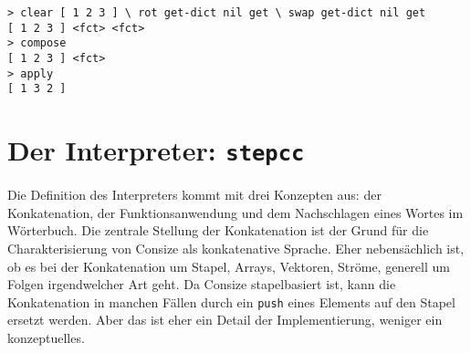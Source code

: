 \begin{verbatim}
> clear [ 1 2 3 ] \ rot get-dict nil get \ swap get-dict nil get
[ 1 2 3 ] <fct> <fct>
> compose
[ 1 2 3 ] <fct>
> apply
[ 1 3 2 ]
\end{verbatim}

\section{Der Interpreter: \texttt{stepcc}}
\label{Sec:stepcc}

Die Definition des Interpreters kommt mit drei Konzepten aus: der Konkatenation, der Funktionsanwendung und dem Nachschlagen eines Wortes im Wörterbuch. Die zentrale Stellung der Konkatenation ist der Grund für die Charakterisierung von Consize als konkatenative Sprache. Eher nebensächlich ist, ob es bei der Konkatenation um Stapel, Arrays, Vektoren, Ströme, generell um Folgen irgendwelcher Art geht. Da Consize stapelbasiert ist, kann die Konkatenation in manchen Fällen durch ein \verb|push| eines Elements auf den Stapel ersetzt werden. Aber das ist eher ein Detail der Implementierung, weniger ein konzeptuelles.

